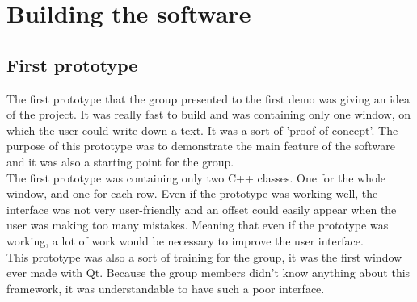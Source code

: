 \chapter{Building the software}
\section{First prototype}
The first prototype that the group presented to the first demo was giving an idea of the project. It was really fast to build and was containing only one window, on which the user could write down a text. It was a sort of 'proof of concept'. The purpose of this prototype was to demonstrate the main feature of the software and it was also a starting point for the group.\\
The first prototype was containing only two C++ classes. One for the whole window, and one for each row. Even if the prototype was working well, the interface was not very user-friendly and an offset could easily appear when the user was making too many mistakes.
Meaning that even if the prototype was working, a lot of work would be necessary to improve the user interface. \\
This prototype was also a sort of training for the group, it was the first window ever made with Qt. Because the group members didn't know anything about this framework, it was understandable to have such a poor interface.

